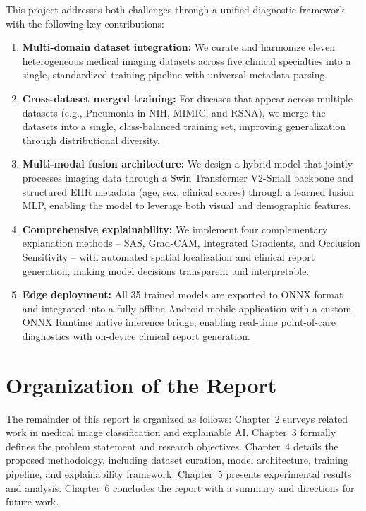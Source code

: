 \documentclass[12pt,a4paper]{report}
\begin{document}
This project addresses both challenges through a unified diagnostic framework with the following key contributions:

\begin{enumerate}
    \item \textbf{Multi-domain dataset integration:} We curate and harmonize eleven heterogeneous medical imaging datasets across five clinical specialties into a single, standardized training pipeline with universal metadata parsing.
    
    \item \textbf{Cross-dataset merged training:} For diseases that appear across multiple datasets (e.g., Pneumonia in NIH, MIMIC, and RSNA), we merge the datasets into a single, class-balanced training set, improving generalization through distributional diversity.
    
    \item \textbf{Multi-modal fusion architecture:} We design a hybrid model that jointly processes imaging data through a Swin Transformer V2-Small backbone and structured EHR metadata (age, sex, clinical scores) through a learned fusion MLP, enabling the model to leverage both visual and demographic features.
    
    \item \textbf{Comprehensive explainability:} We implement four complementary explanation methods -- SAS, Grad-CAM, Integrated Gradients, and Occlusion Sensitivity -- with automated spatial localization and clinical report generation, making model decisions transparent and interpretable.
    
    \item \textbf{Edge deployment:} All 35 trained models are exported to ONNX format and integrated into a fully offline Android mobile application with a custom ONNX Runtime native inference bridge, enabling real-time point-of-care diagnostics with on-device clinical report generation.
\end{enumerate}

\section{Organization of the Report}

The remainder of this report is organized as follows: Chapter~2 surveys related work in medical image classification and explainable AI. Chapter~3 formally defines the problem statement and research objectives. Chapter~4 details the proposed methodology, including dataset curation, model architecture, training pipeline, and explainability framework. Chapter~5 presents experimental results and analysis. Chapter~6 concludes the report with a summary and directions for future work.
\end{document}
